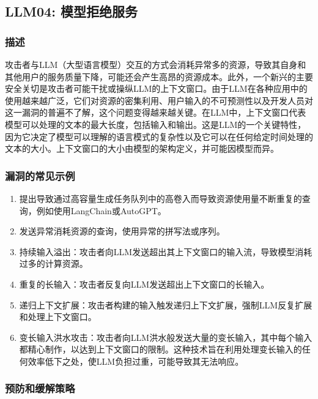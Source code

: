 \documentclass[
]{article}
\author{}
\date{}
\providecommand{\tightlist}{%
  \setlength{\itemsep}{0pt}\setlength{\parskip}{0pt}}
\begin{document}
\subsection{LLM04:
模型拒绝服务}\label{llm04-ux6a21ux578bux62d2ux7eddux670dux52a1}

\subsubsection{描述}\label{ux63cfux8ff0}

攻击者与LLM（大型语言模型）交互的方式会消耗异常多的资源，导致其自身和其他用户的服务质量下降，可能还会产生高昂的资源成本。此外，一个新兴的主要安全关切是攻击者可能干扰或操纵LLM的上下文窗口。由于LLM在各种应用中的使用越来越广泛，它们对资源的密集利用、用户输入的不可预测性以及开发人员对这一漏洞的普遍不了解，这个问题变得越来越关键。在LLM中，上下文窗口代表模型可以处理的文本的最大长度，包括输入和输出。这是LLM的一个关键特性，因为它决定了模型可以理解的语言模式的复杂性以及它可以在任何给定时间处理的文本的大小。上下文窗口的大小由模型的架构定义，并可能因模型而异。

\subsubsection{漏洞的常见示例}\label{ux6f0fux6d1eux7684ux5e38ux89c1ux793aux4f8b}

\begin{enumerate}
\def\labelenumi{\arabic{enumi}.}
\tightlist
\item
  提出导致通过高容量生成任务队列中的高卷入而导致资源使用量不断重复的查询，例如使用LangChain或AutoGPT。
\item
  发送异常消耗资源的查询，使用异常的拼写法或序列。
\item
  持续输入溢出：攻击者向LLM发送超出其上下文窗口的输入流，导致模型消耗过多的计算资源。
\item
  重复的长输入：攻击者反复向LLM发送超出上下文窗口的长输入。
\item
  递归上下文扩展：攻击者构建的输入触发递归上下文扩展，强制LLM反复扩展和处理上下文窗口。
\item
  变长输入洪水攻击：攻击者向LLM洪水般发送大量的变长输入，其中每个输入都精心制作，以达到上下文窗口的限制。这种技术旨在利用处理变长输入的任何效率低下之处，使LLM负担过重，可能导致其无法响应。
\end{enumerate}

\subsubsection{预防和缓解策略}\label{ux9884ux9632ux548cux7f13ux89e3ux7b56ux7565}
\end{document}

